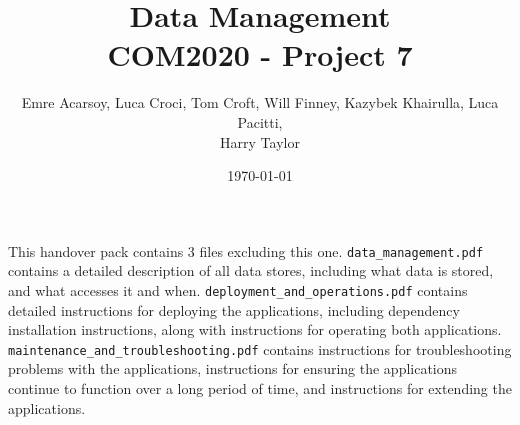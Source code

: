 \documentclass[11pt]{article}
\title{Data Management\\[0.3em]
\large COM2020 - Project 7}
\author{Emre Acarsoy, Luca Croci, Tom Croft, Will Finney, Kazybek Khairulla, Luca Pacitti, \\ Harry Taylor}
\date{\today}
\begin{document}
\maketitle

This handover pack contains 3 files excluding this one. \verb|data_management.pdf| contains a detailed description of all data stores, including what data is stored, and what accesses it and when. \verb|deployment_and_operations.pdf| contains detailed instructions for deploying the applications, including dependency installation instructions, along with instructions for operating both applications. \verb|maintenance_and_troubleshooting.pdf| contains instructions for troubleshooting problems with the applications, instructions for ensuring the applications continue to function over a long period of time, and instructions for extending the applications. 
\end{document}
